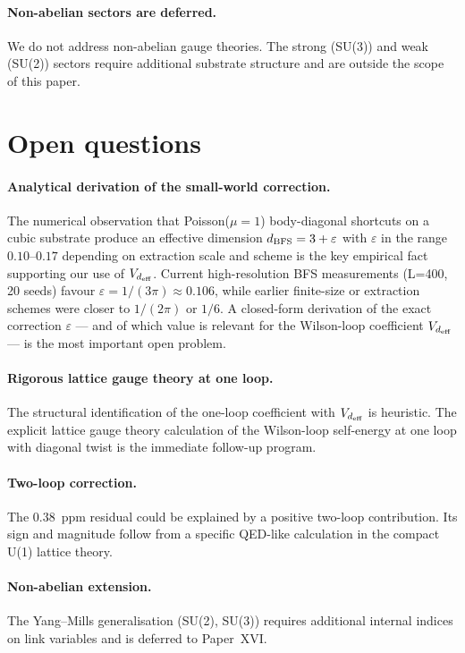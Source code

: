 \documentclass[11pt,a4paper]{article}
\begin{document}
\paragraph{Non-abelian sectors are deferred.}
We do not address non-abelian gauge theories. The strong (SU(3))
and weak (SU(2)) sectors require additional substrate structure
and are outside the scope of this paper.

\section{Open questions}
\label{sec:open}

\paragraph{Analytical derivation of the small-world correction.}
The numerical observation that Poisson($\mu = 1$) body-diagonal
shortcuts on a cubic substrate produce an effective dimension
$d_{\rm BFS} = 3 + \varepsilon$ with $\varepsilon$ in the range
$0.10\text{--}0.17$ depending on extraction scale and scheme is
the key empirical fact supporting our use of $V_{d_{\rm eff}}$.
Current high-resolution BFS measurements (L=400, 20 seeds)
favour $\varepsilon = 1/(3\pi) \approx 0.106$, while earlier
finite-size or extraction schemes were closer to $1/(2\pi)$ or
$1/6$. A closed-form derivation of the exact correction
$\varepsilon$ --- and of which value is relevant for the
Wilson-loop coefficient $V_{d_{\rm eff}}$ --- is the most
important open problem.

\paragraph{Rigorous lattice gauge theory at one loop.}
The structural identification of the one-loop coefficient
with $V_{d_{\rm eff}}$ is heuristic. The explicit lattice
gauge theory calculation of the Wilson-loop self-energy at
one loop with diagonal twist is the immediate follow-up
program.

\paragraph{Two-loop correction.}
The $0.38$~ppm residual could be explained by a positive
two-loop contribution. Its sign and magnitude follow from a
specific QED-like calculation in the compact U(1) lattice
theory.

\paragraph{Non-abelian extension.}
The Yang--Mills generalisation (SU(2), SU(3)) requires
additional internal indices on link variables and is deferred
to Paper~XVI.
\end{document}
